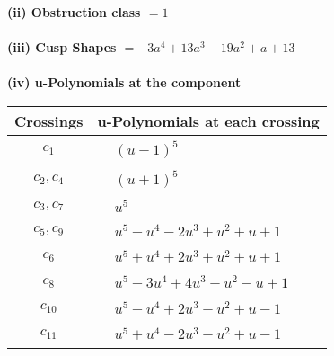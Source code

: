 \documentclass[1p]{elsarticle_modified}
\theoremstyle{definition}
\begin{document}
\flushleft \textbf{(ii) Obstruction class $= 1$}\\~\\
\flushleft \textbf{(iii) Cusp Shapes $= -3 a^4+13 a^3-19 a^2+a+13$}\\~\\
\newpage\renewcommand{\arraystretch}{1}
\flushleft \textbf{(iv) u-Polynomials at the component}\newline \\
\begin{tabular}{m{50pt}|m{274pt}}
Crossings & \hspace{64pt}u-Polynomials at each crossing \\
\hline $$\begin{aligned}c_{1}\end{aligned}$$&$\begin{aligned}
&(u-1)^5
\end{aligned}$\\
\hline $$\begin{aligned}c_{2},c_{4}\end{aligned}$$&$\begin{aligned}
&(u+1)^5
\end{aligned}$\\
\hline $$\begin{aligned}c_{3},c_{7}\end{aligned}$$&$\begin{aligned}
&u^5
\end{aligned}$\\
\hline $$\begin{aligned}c_{5},c_{9}\end{aligned}$$&$\begin{aligned}
&u^5- u^4-2 u^3+u^2+u+1
\end{aligned}$\\
\hline $$\begin{aligned}c_{6}\end{aligned}$$&$\begin{aligned}
&u^5+u^4+2 u^3+u^2+u+1
\end{aligned}$\\
\hline $$\begin{aligned}c_{8}\end{aligned}$$&$\begin{aligned}
&u^5-3 u^4+4 u^3- u^2- u+1
\end{aligned}$\\
\hline $$\begin{aligned}c_{10}\end{aligned}$$&$\begin{aligned}
&u^5- u^4+2 u^3- u^2+u-1
\end{aligned}$\\
\hline $$\begin{aligned}c_{11}\end{aligned}$$&$\begin{aligned}
&u^5+u^4-2 u^3- u^2+u-1
\end{aligned}$\\
\hline
\end{tabular}\\~\\
\end{document}
